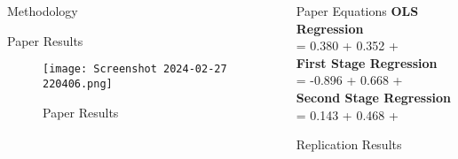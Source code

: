 \documentclass[final]{beamer}
\begin{document}
\begin{frame}[t]
\begin{columns}[T]
\begin{column}{.32\textwidth}
\begin{block}{\Huge Methodology}
    \normalsize 
    \end{block}

    \vspace{1cm} %
\begin{block}{\Huge Paper Results} %
    \Large %
    \end{block}
\begin{figure}
    \centering
    \texttt{[image: Screenshot 2024-02-27 220406.png]}
    \caption{Paper Results}
    \label{fig:enter-label}
\end{figure}
    \vspace{1cm} %

    \vspace{1cm} %
   
\end{column}

\begin{column}{.32\textwidth}

        \begin{block}{\Huge Paper Equations} %
            \large %
\centering
\textbf{OLS Regression}\\
\normalsize
{} = 0.380 + 0.352 + \epsilon \\
\large
\textbf{First Stage Regression }\\
\normalsize
{} = -0.896 + 0.668 + \epsilon \\
\large
\textbf{Second Stage  Regression} \\
\normalsize
{} = 0.143 + 0.468 + \epsilon

    
    \end{block}
 \begin{block}{\Huge Replication Results} %
    \Large %



\end{block}
\end{column}
\end{columns}
\end{frame}
\end{document}
